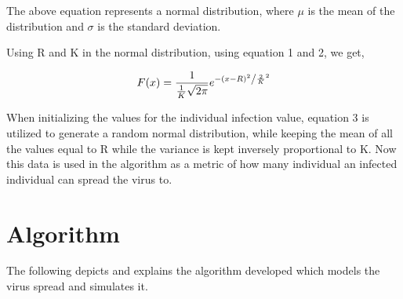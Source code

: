 \documentclass[11pt]{article}
\begin{document}
The above equation represents a normal distribution, where $\mu$ is the mean of the distribution and $\sigma$ is the standard deviation.

Using R and K in the normal distribution, using equation 1 and 2, we get,

\begin{equation}
    F(x) = \frac{1}{{\frac{1}{K} \sqrt {2\pi } }}e^{{{ - \left( {x - R } \right)^2 } \mathord{\left/ {\vphantom {{ - \left( {x - R } \right)^2 } {\frac{2}{K} ^2 }}} \right. \kern-\nulldelimiterspace} {\frac{2}{K} ^2 }}}
\end{equation}

When initializing the values for the individual infection value, equation 3 is utilized to generate a random normal distribution, while keeping the mean of all the values equal to R while the variance is kept inversely proportional to K. Now this data is used in the algorithm as a metric of how many individual an infected individual can spread the virus to.

\section{Algorithm}
The following depicts and explains the algorithm developed which models the virus spread and simulates it.
\end{document}
